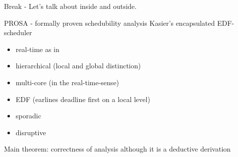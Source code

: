 \documentclass{beamer}
\begin{document}
 	\begin{frame}{Break - Let's talk about inside and outside. }
 	
	 	
		\begin{figure}
			\centering
		\end{figure} 	 	
 	\end{frame}
 	
	

 	
 	\begin{frame}{PROSA - formally proven schedubility analysis}
		Kasier's  encapsulated EDF-scheduler \cite{K}
		\begin{itemize}
			\item real-time as in \cite{KBK}
			\item hierarchical (local and global distinction)
			\item multi-core (in the real-time-sense)
			\item EDF (earlines deadline first on a local level)
			\item sporadic 
			\item disruptive
		\end{itemize}	
		Main theorem: correctness of analysis although it is a deductive derivation				
 	\end{frame}

 	
\end{document}
